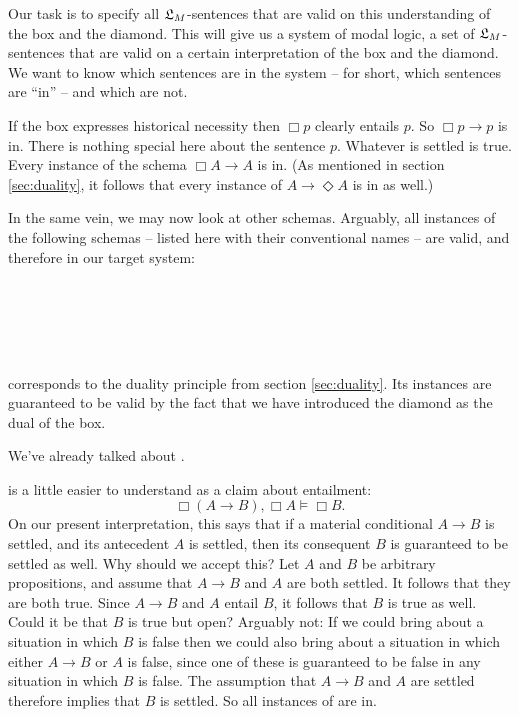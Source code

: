 
Our task is to specify all $\mathfrak{L}_{M}$-sentences that are valid on this
understanding of the box and the diamond. This will give us a system of modal
logic, a set of $\mathfrak{L}_{M}$-sentences that are valid on a certain interpretation of
the box and the diamond. We want to know which sentences are in the system --
for short, which sentences are ``in'' -- and which are not.

If the box expresses historical necessity then $\Box p$ clearly entails $p$. So
$\Box p \to p$ is in. There is nothing special here about the sentence $p$.
Whatever is settled is true. Every instance of the schema $\Box A \to A$ is in.
(As mentioned in section \ref{sec:duality}, it follows that every instance of
$A \to \Diamond A$ is in as well.)

In the same vein, we may now look at other schemas. Arguably, all instances of
the following schemas -- listed here with their conventional names -- are valid,
and therefore in our target system:
%
\begin{principles}
  \\
  \\
  \\
  \\
\end{principles}

 corresponds to the duality principle  from section
\ref{sec:duality}. Its instances are guaranteed to be valid by the fact that we
have introduced the diamond as the dual of the box.

We've already talked about .

 is a little easier to understand as a claim about entailment:
\[
  \Box(A \to B), \Box A \models \Box B.
\]
On our present interpretation, this says that if a material conditional $A\to B$
is settled, and its antecedent $A$ is settled, then its consequent $B$ is
guaranteed to be settled as well. Why should we accept this? Let $A$ and
$B$ be arbitrary propositions, and assume that $A\to B$ and $A$ are both
settled. It follows that they are both true. Since $A\to B$ and $A$ entail $B$,
it follows that $B$ is true as well. Could it be that $B$ is true but open?
Arguably not: If we could bring about a situation in which $B$ is false then we
could also bring about a situation in which either $A\to B$ or $A$ is false,
since one of these is guaranteed to be false in any situation in which $B$ is
false. The assumption that $A\to B$ and $A$ are settled therefore implies that
$B$ is settled. So all instances of  are in.

